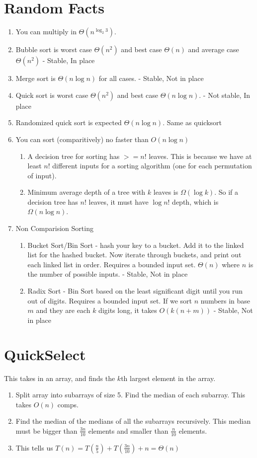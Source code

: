 \documentclass[12pt,twocolumn]{article}
\begin{document}
\section{Random Facts}
\begin{enumerate}
    \item You can multiply in $\Theta(n^{\log_2 3})$.
    \item Bubble sort is worst case $\Theta(n^2)$ and best case $\Theta(n)$ and average case $\Theta(n^2)$ - Stable, In place
    \item Merge sort is $\Theta(n \log n)$ for all cases. - Stable, Not in place
    \item Quick sort is worst case $\Theta(n^2)$ and best case $\Theta(n \log n)$. - Not stable, In place
    \item Randomized quick sort is expected $\Theta(n \log n)$. Same as quicksort
    \item You can sort (comparitively) no faster than $O(n \log n)$
        \begin{enumerate}
            \item A decision tree for sorting has $>= n!$ leaves. This is because we have at least $n!$ different inputs for a sorting algorithm (one for each permutation of input).
            \item Minimum average depth of a tree with $k$ leaves is $\Omega(\log k)$. So if a decision tree has $n!$ leaves, it must have $\log n!$ depth, which is $\Omega(n \log n)$.
        \end{enumerate}
    \item Non Comparision Sorting
        \begin{enumerate}
            \item Bucket Sort/Bin Sort - hash your key to a bucket. Add it to the linked list for the hashed bucket. Now iterate through buckets, and print out each linked list in order. Requires a bounded input set. $\Theta(n)$ where $n$ is the number of possible inputs. - Stable, Not in place
            \item Radix Sort - Bin Sort based on the least significant digit until you run out of digits. Requires a bounded input set. If we sort $n$ numbers in base $m$ and they are each $k$ digits long, it takes $O(k(n + m))$ - Stable, Not in place
        \end{enumerate}
\end{enumerate}

\section{QuickSelect}
This takes in an array, and finds the $k$th largest element in the array.
\begin{enumerate}
    \item Split array into subarrays of size 5. Find the median of each subarray. This takes $O(n)$ comps.
    \item Find the median of the medians of all the subarrays recursively. This median must be bigger than $\frac{3n}{10}$ elements and smaller than $\frac{n}{10}$ elements.
    \item This tells us $T(n) = T(\frac{n}{5}) + T(\frac{3n}{10}) + n = \Theta(n)$
\end{enumerate}
\end{document}
